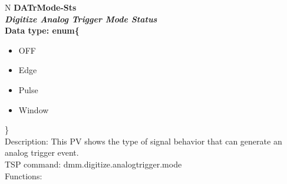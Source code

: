 \documentclass[openany]{article}
\begin{document}
		\begin{tabular}{N}
			\hline
			\bfseries DATrMode-Sts\label{pv:datrmode-sts} \\ \hline
			\emph{Digitize Analog Trigger Mode Status} \\
			Data type: enum\{\begin{itemize}[noitemsep]
				\small
				\item[] OFF
				\item[] Edge
				\item[] Pulse
				\item[] Window
			\end{itemize}\} \\
			Description: This PV shows the type of signal behavior that can generate an analog trigger event. \\
			TSP command: dmm.digitize.analogtrigger.mode \\
			Functions: \\
			\arrayrulecolor{\FuncTableBorderColor}

		\end{tabular}
\end{document}
